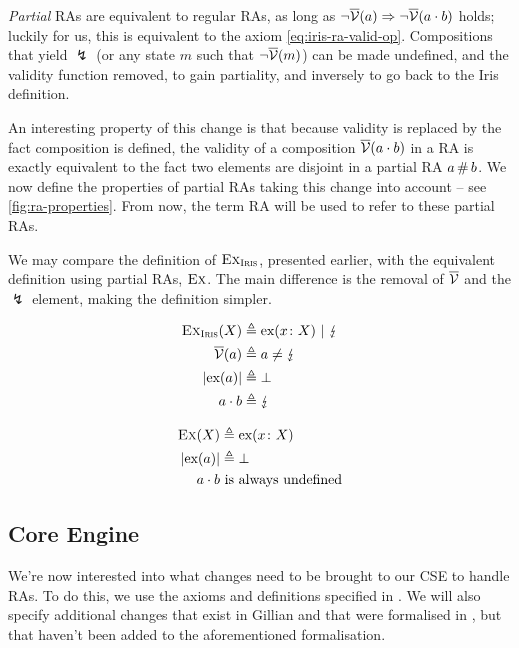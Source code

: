 \emph{Partial} RAs are equivalent to regular RAs, as long as ${\neg\overline{\cal V}(a)\Rightarrow \neg\overline{\cal V}(a\cdot b)}$ holds; luckily for us, this is equivalent to the axiom \eqref{eq:iris-ra-valid-op}. Compositions that yield $\lightning$ (or any state $m$ such that $\neg\overline{\cal V}(m)$) can be made undefined, and the validity function removed, to gain partiality, and inversely to go back to the Iris definition.

An interesting property of this change is that because validity is replaced by the fact composition is defined, the validity of a composition $\overline{\cal V}(a\cdot b)$ in a RA is exactly equivalent to the fact two elements are disjoint in a partial RA $a \operatorname{\#} b$. We now define the properties of partial RAs taking this change into account -- see \autoref{fig:ra-properties}. From now, the term RA will be used to refer to these partial RAs.

We may compare the definition of $\textsc{Ex}_{\textsc{Iris}}$, presented earlier, with the equivalent definition using partial RAs, $\textsc{Ex}$. The main difference is the removal of $\overline{\cal V}$ and the $\lightning$ element, making the definition simpler.

\noindent\begin{minipage}{.5\linewidth}
\begin{align*}
	\textsc{Ex}_{\textsc{Iris}}(X) &\triangleq \text{ex}(x\colon X) ~|~ \lightning \\
	\overline{\cal V}(a) &\triangleq a \neq \lightning \\
	|\text{ex}(a)| &\triangleq \bot\\
	a \cdot b &\triangleq \lightning
\end{align*}\end{minipage}%
\begin{minipage}{.5\linewidth}
\begin{align*}
	\textsc{Ex}(X) &\triangleq \text{ex}(x\colon X) \\
	|\text{ex}(a)| &\triangleq \bot\\
	a \cdot b & \text{ is always undefined}
\end{align*}\end{minipage}


\subsection{Core Engine}

We're now interested into what changes need to be brought to our CSE to handle RAs. To do this, we use the axioms and definitions specified in \cite{cse2}. We will also specify additional changes that exist in Gillian and that were formalised in \cite{sacha-phd}, but that haven't been added to the aforementioned formalisation.

